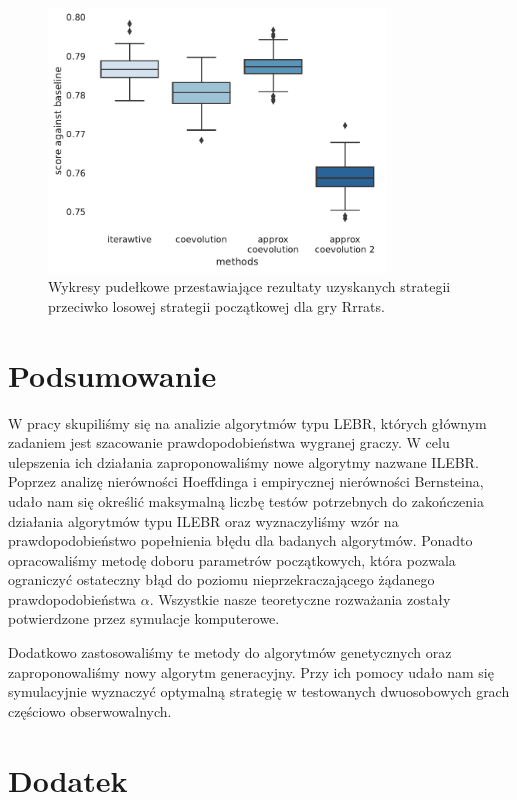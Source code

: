 \documentclass[inzynierska]{pwr_wmat_praca_dyplomowa}
\theoremstyle{plain}
\numberwithin{theorem}{chapter}
\theoremstyle{definition}
\numberwithin{theorem}{chapter}
\begin{document}
	\begin{figure}
		\centering
		\includegraphics[width=0.8\textwidth]{imagens/rrrats_results.pdf}
		\caption{Wykresy pudełkowe przestawiające rezultaty uzyskanych strategii przeciwko losowej strategii początkowej dla gry Rrrats.}
		\label{fig:rrrats_results}
	\end{figure}

	\newpage

	
	
{\backmatter \chapter{Podsumowanie}}
W pracy skupiliśmy się na analizie algorytmów typu LEBR, których głównym zadaniem jest szacowanie prawdopodobieństwa wygranej graczy.  W celu ulepszenia ich działania zaproponowaliśmy nowe algorytmy nazwane ILEBR. Poprzez analizę nierówności Hoeffdinga i empirycznej nierówności Bernsteina, udało nam się określić maksymalną liczbę testów potrzebnych do zakończenia działania algorytmów typu ILEBR oraz wyznaczyliśmy wzór na prawdopodobieństwo popełnienia błędu dla badanych algorytmów. Ponadto opracowaliśmy metodę doboru parametrów początkowych, która pozwala ograniczyć ostateczny błąd do poziomu nieprzekraczającego żądanego prawdopodobieństwa $\alpha$. Wszystkie nasze teoretyczne rozważania zostały potwierdzone przez symulacje komputerowe.

Dodatkowo zastosowaliśmy te metody do algorytmów genetycznych oraz zaproponowaliśmy nowy algorytm generacyjny. Przy ich pomocy udało nam się symulacyjnie wyznaczyć optymalną strategię w testowanych dwuosobowych grach częściowo obserwowalnych. 


{\backmatter \chapter{Dodatek}} \label{Dodatek}
\end{document}
